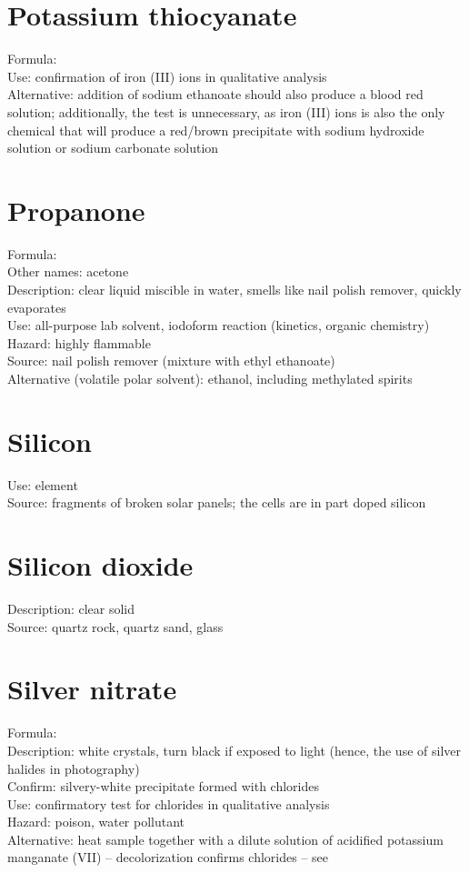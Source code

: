 \section{Potassium thiocyanate}
\label{sec:}
Formula: \\
Use: confirmation of iron (III) ions in qualitative analysis\\
Alternative: addition of sodium ethanoate 
should also produce a blood red solution; 
additionally, 
the test is unnecessary, 
as iron (III) ions is also the only chemical 
that will produce a red/brown precipitate 
with sodium hydroxide solution or sodium carbonate solution

\section{Propanone}
\label{sec:propanone}
Formula: \\
Other names: acetone\\
Description: clear liquid miscible in water, 
smells like nail polish remover, 
quickly evaporates\\
Use: all-purpose lab solvent, 
iodoform reaction (kinetics, organic chemistry)\\
Hazard: highly flammable\\
Source: nail polish remover (mixture with ethyl ethanoate)\\
Alternative (volatile polar solvent): ethanol, 
including methylated spirits

\section{Silicon}
\label{sec:}
Use: element\\
Source: fragments of broken solar panels; 
the cells are in part doped silicon

\section{Silicon dioxide}
\label{sec:}
Description: clear solid\\
Source: quartz rock, 
quartz sand, 
glass

\section{Silver nitrate}
\label{sec:}
Formula: \\
Description: white crystals, 
turn black if exposed to light (hence, 
the use of silver halides in photography)\\
Confirm: silvery-white precipitate formed with chlorides\\
Use: confirmatory test for chlorides in qualitative analysis\\
Hazard: poison, 
water pollutant\\
Alternative: heat sample together 
with a dilute solution of acidified potassium manganate (VII) -- 
decolorization confirms chlorides -- see 

